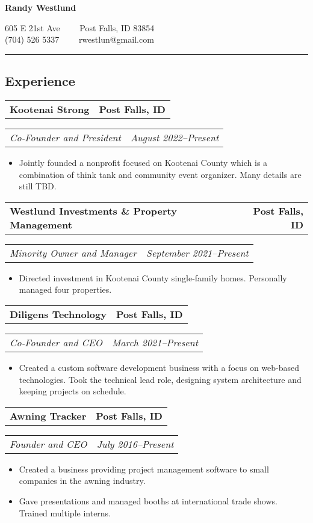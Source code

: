 \documentclass[10pt,letterpaper]{article}
\newcommand{\headerrow}[2]{%
    \begin{tabularx}{\linewidth}{Xr}
	    #1 & #2 \\
    \end{tabularx}
}
\begin{document}
\begin{center}
{\LARGE \textbf{Randy Westlund}}

605 E 21st Ave \ \ \textbullet \ \ Post Falls, ID 83854 \\
(704) 526 5337 \ \ \textbullet \ \ rwestlun@gmail.com \\
\end{center}

\vspace{-4pt}
\hrule
\vspace{-0.8em}
\subsection*{Experience}
  \headerrow{\textbf{Kootenai Strong}}{\textbf{Post Falls, ID}}
	\headerrow{\textit{Co-Founder and President}}{\textit{August 2022--Present}}
    \begin{itemize}[label=--]
        \item Jointly founded a nonprofit focused on Kootenai County which is a combination of think tank and community event organizer. Many details are still TBD.
	\end{itemize}

  \headerrow{\textbf{Westlund Investments \& Property Management}}{\textbf{Post Falls, ID}}
	\headerrow{\textit{Minority Owner and Manager}}{\textit{September 2021--Present}}
    \begin{itemize}[label=--]
        \item Directed investment in Kootenai County single-family homes. Personally managed four properties.
	\end{itemize}

	\headerrow{\textbf{Diligens Technology}}{\textbf{Post Falls, ID}}
	\headerrow{\textit{Co-Founder and CEO}}{\textit{March 2021--Present}}
    \begin{itemize}[label=--]
        \item Created a custom software development business with a focus on web-based technologies.
          Took the technical lead role, designing system architecture and keeping projects on schedule.
	\end{itemize}

	\headerrow{\textbf{Awning Tracker}}{\textbf{Post Falls, ID}}
	\headerrow{\textit{Founder and CEO}}{\textit{July 2016--Present}}
    \begin{itemize}[label=--]
        \item Created a business providing project management
            software to small companies in the awning industry.

        \item Gave presentations and managed booths at international trade shows. Trained multiple interns.
	\end{itemize}
\end{document}
